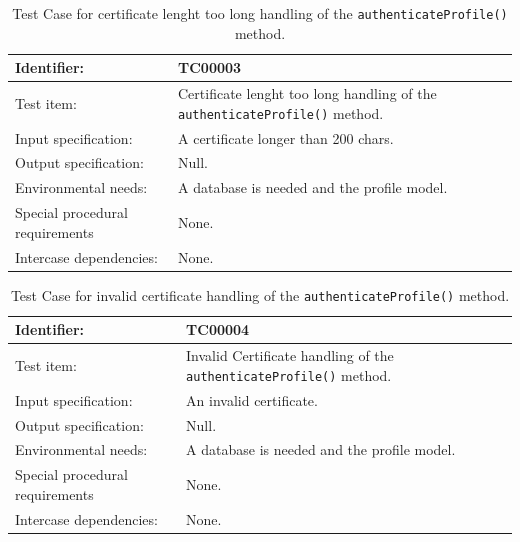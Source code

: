 \begin{table}[htbp]
	\centering
		\begin{tabular}{| p{4.5cm} | m{9cm} |}
			\hline
			Identifier: 					& TC00003 \\ \hline
			Test item:						& Certificate lenght too long handling of the \texttt{authenticateProfile()} method. \\ \hline
			Input specification:			& A certificate longer than 200 chars. \\ \hline
			Output specification: 			& Null. \\ \hline
			Environmental needs:			& A database is needed and the profile model. \\ \hline
			Special procedural requirements	& None. \\ \hline
			Intercase dependencies:			& None. \\ \hline
		\end{tabular}
	\caption{Test Case for certificate lenght too long handling of the \texttt{authenticateProfile()} method.}
	\label{tab:TestCase_CertificateToLongHandling}
\end{table}

\begin{table}[htbp]
	\centering
		\begin{tabular}{| p{4.5cm} | m{9cm} |}
			\hline
			Identifier: 					& TC00004 \\ \hline
			Test item:						& Invalid Certificate handling of the \texttt{authenticateProfile()} method. \\ \hline
			Input specification:			& An invalid certificate. \\ \hline
			Output specification: 			& Null. \\ \hline
			Environmental needs:			& A database is needed and the profile model. \\ \hline
			Special procedural requirements	& None. \\ \hline
			Intercase dependencies:			& None. \\ \hline
		\end{tabular}
	\caption{Test Case for invalid certificate handling of the \texttt{authenticateProfile()} method.}
	\label{tab:TestCase_InvalidCertificateHandling}
\end{table}

